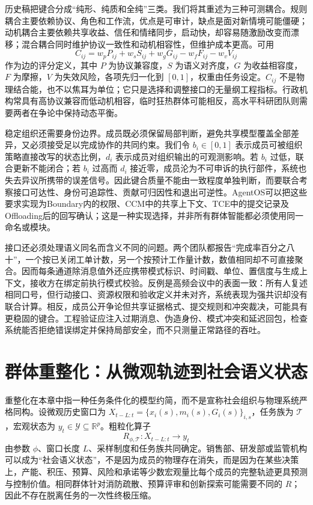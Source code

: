 历史稿把键合分成“纯形、纯质和全纯”三类。我们将其重述为三种可测耦合。规则耦合主要依赖协议、角色和工作流，优点是可审计，缺点是面对新情境可能僵硬；动机耦合主要依赖共享收益、信任和情绪同步，启动快，却容易随激励改变而漂移；混合耦合同时维护协议一致性和动机相容性，但维护成本更高。可用
\begin{equation}
C_{ij}=w_pP_{ij}+w_sS_{ij}+w_gG_{ij}-w_fF_{ij}-w_vV_{ij}
\end{equation}
作为边的评分定义，其中 $P$ 为协议兼容度，$S$ 为语义对齐度，$G$ 为收益相容度，$F$ 为摩擦，$V$ 为失效风险，各项先归一化到 $[0,1]$，权重由任务设定。$C_{ij}$ 不是物理结合能，也不以焦耳为单位；它只是选择和调整接口的无量纲工程指标。行政机构常具有高协议兼容而低动机相容，临时狂热群体可能相反，高水平科研团队则需要两者在争论中保持动态平衡。

稳定组织还需要身份边界。成员既必须保留局部判断，避免共享模型覆盖全部差异，又必须接受足以完成协作的共同约束。我们令 $b_i\in[0,1]$ 表示成员可被组织策略直接改写的状态比例，$d_i$ 表示成员对组织输出的可观测影响。若 $b_i$ 过低，联合更新不能闭合；若 $b_i$ 过高而 $d_i$ 接近零，成员沦为不可申诉的执行部件，系统也失去异议所携带的误差信号。因此键合质量不能由一致程度单独判断，而要联合考察接口可达性、身份可追踪性、贡献可归因性和退出可逆性。AgentOS可以把这些要求实现为Boundary内的权限、CCM中的共享上下文、TCE中的提交记录及Offloading后的回写确认；这是一种实现选择，并非所有群体智能都必须使用同一命名或模块。

接口还必须处理语义同名而含义不同的问题。两个团队都报告“完成率百分之八十”，一个按已关闭工单计数，另一个按预计工作量计数，数值相同却不可直接聚合。因而每条通道除消息值外还应携带模式标识、时间戳、单位、置信度与生成上下文，接收方在绑定前执行模式校验。反例是高频会议中的表面一致：所有人复述相同口号，但行动接口、资源权限和验收定义并未对齐，系统表现为强共识却没有联合计算。相反，成员公开争论但共享证据格式、提交规则和冲突裁决，可能具有更稳固的键合。工程验证应注入过期消息、伪造身份、模式冲突和延迟回包，检查系统能否拒绝错误绑定并保持局部安全，而不只测量正常路径的吞吐。

\section{群体重整化：从微观轨迹到社会语义状态}
\label{sec:fractal_renormalization_social_semantions}

重整化在本章中指一种任务条件化的模型约简，而不是宣称社会组织与物理系统严格同构。设微观历史窗口为 $X_{t-L:t}=\{x_i(s),m_i(s),G_i(s)\}_{i,s}$，任务族为 $\mathcal T$，宏观状态为 $y_t\in\mathcal Y\subseteq\mathbb R^p$。粗粒化算子
\begin{equation}
R_{\phi,\mathcal T}:X_{t-L:t}\longrightarrow y_t
\end{equation}
由参数 $\phi$、窗口长度 $L$、采样制度和任务族共同确定。销售部、研发部或监管机构可以成为“社会语义状态”，不是因为成员的物理存在消失，而是因为在某些决策上，产能、积压、预算、风险和承诺等少数宏观量比每个成员的完整轨迹更具预测与控制价值。相同群体针对消防疏散、预算评审和创新探索可能需要不同的 $R$；因此不存在脱离任务的一次性终极压缩。

